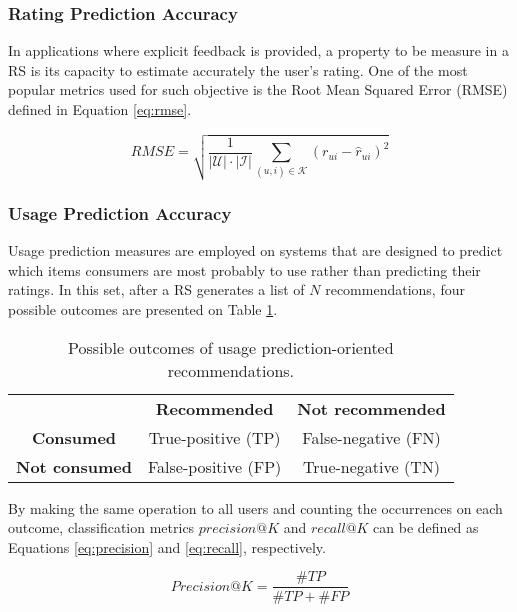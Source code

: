 \subsubsection{Rating Prediction Accuracy}

In applications where explicit feedback is provided, a property to be measure in a RS is its capacity to estimate accurately the user's rating. One of the most popular metrics used for such objective is the Root Mean Squared Error (RMSE)  defined in Equation \ref{eq:rmse}.

\begin{equation}
\label{eq:rmse}
    RMSE = \sqrt{\frac{1}{|\mathcal{U}| \cdot |\mathcal{I}|}\sum_{(u,i) \in \mathcal{K}}(r_{ui} - \hat{r}_{ui})^2}
\end{equation}

\subsubsection{Usage Prediction Accuracy}

Usage prediction measures are employed on systems that are designed to predict which items consumers are most probably to use rather than predicting their ratings. In this set, after a RS generates a list of $N$ recommendations, four possible outcomes are presented on Table \ref{tab:usage_table}.

\begin{table}[h]
	\centering
	\begin{tabular}{@{}ccc@{}}
		& \textbf{Recommended}                     & \textbf{Not recommended}                 \\ 
		\multicolumn{1}{c|}{\textbf{Consumed}}     & \multicolumn{1}{c|}{True-positive (TP)}  & \multicolumn{1}{c|}{False-negative (FN)} \\ 
		\multicolumn{1}{c|}{\textbf{Not consumed}} & \multicolumn{1}{c|}{False-positive (FP)} & \multicolumn{1}{c|}{True-negative (TN)}  \\ 
	\end{tabular}
	\caption{Possible outcomes of usage prediction-oriented recommendations.}
	\label{tab:usage_table}
\end{table}

By making the same operation to all users and counting the occurrences on each outcome, classification metrics $precision@K$ and $recall@K$ can be defined as Equations \ref{eq:precision} and \ref{eq:recall}, respectively.

\begin{equation}
\label{eq:precision}
Precision@K = \frac{\#TP}{\#TP + \#FP}
\end{equation}

